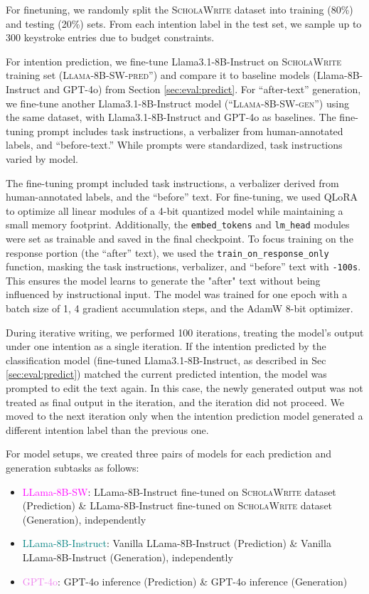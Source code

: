 For finetuning, we randomly split the \textsc{ScholaWrite} dataset into training (80\%) and testing (20\%) sets. From each intention label in the test set, we sample up to 300 keystroke entries due to budget constraints. 

For intention prediction, we fine-tune Llama3.1-8B-Instruct on \textsc{ScholaWrite} training set (\textsc{Llama-8B-SW-pred}'') and compare it to baseline models (Llama-8B-Instruct and GPT-4o) from Section \ref{sec:eval:predict}. For ``after-text'' generation, we fine-tune another Llama3.1-8B-Instruct model (``\textsc{Llama-8B-SW-gen}'') using the same dataset, with Llama3.1-8B-Instruct and GPT-4o as baselines. The fine-tuning prompt includes task instructions, a verbalizer from human-annotated labels, and ``before-text.'' While prompts were standardized, task instructions varied by model. 


The fine-tuning prompt included task instructions, a verbalizer derived from human-annotated labels, and the ``before'' text. For fine-tuning, we used QLoRA \cite{dettmers2024qlora} to optimize all linear modules of a 4-bit quantized model while maintaining a small memory footprint. Additionally, the \texttt{embed\_tokens} and \texttt{lm\_head} modules were set as trainable and saved in the final checkpoint. To focus training on the response portion (the ``after'' text), we used the \texttt{train\_on\_response\_only} function, masking the task instructions, verbalizer, and ``before'' text with \texttt{-100s}. This ensures the model learns to generate the "after" text without being influenced by instructional input. The model was trained for one epoch with a batch size of 1, 4 gradient accumulation steps, and the AdamW 8-bit optimizer.

During iterative writing, we performed 100 iterations, treating the model’s output under one intention as a single iteration. If the intention predicted by the classification model (fine-tuned Llama3.1-8B-Instruct, as described in Sec \ref{sec:eval:predict}) matched the current predicted intention, the model was prompted to edit the text again. In this case, the newly generated output was not treated as final output in the iteration, and the iteration did not proceed. We moved to the next iteration only when the intention prediction model generated a different intention label than the previous one.

For model setups, we created three pairs of models for each prediction and generation subtasks as follows: 

\begin{itemize}
    \item \textcolor{magenta}{LLama-8B-SW}: LLama-8B-Instruct fine-tuned on \textsc{ScholaWrite} dataset (Prediction) \& LLama-8B-Instruct fine-tuned on \textsc{ScholaWrite} dataset (Generation), independently
    \item \textcolor{teal}{LLama-8B-Instruct}: Vanilla LLama-8B-Instruct (Prediction) \& Vanilla LLama-8B-Instruct (Generation), independently
     \item \textcolor{violet}{GPT-4o}: GPT-4o inference (Prediction) \& GPT-4o inference (Generation)    
\end{itemize}

